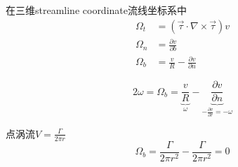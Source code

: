 \begin{defn}

    在三维streamline coordinate流线坐标系中
    \begin{align*}
        \Omega_t&=\left(\vec{\tau}\cdot\nabla\times\vec{\tau}\right)v\\
            \Omega_n&=\frac{\partial v}{\partial b}\\
            \Omega_b&=\frac{v}{R}-\frac{\partial v}{\partial n}
    \end{align*}
\end{defn}
\begin{example}
    \[
        2\omega=\Omega_b=\underbrace{\frac{v}{R}}_{\omega}
        -\underbrace{\frac{\partial v}{\partial n}}_{-\frac{\partial v}{\partial r}=-\omega}
    \]
\end{example}
\begin{example}
    点涡流$V=\frac{\Gamma}{2\pi r}$
    \[
    \Omega_b=\frac{\Gamma}{2\pi r^2}-\frac{\Gamma}{2\pi r^2}=0
    \]
\end{example}
